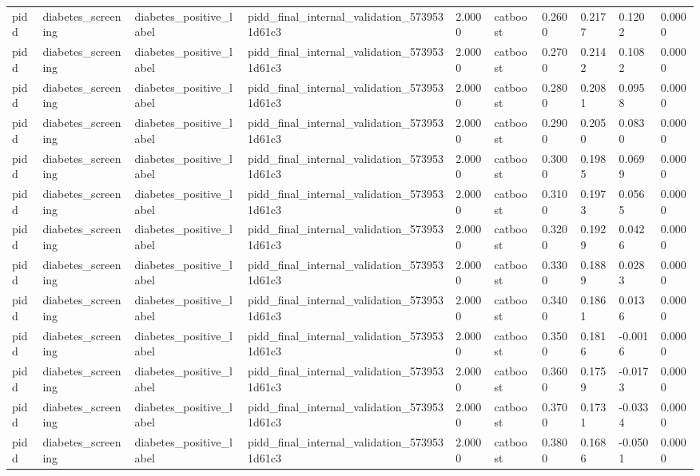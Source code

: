 \begin{tabular}{llllllllll}
pidd & diabetes\_screening & diabetes\_positive\_label & pidd\_final\_internal\_validation\_5739531d61c3 & 2.0000 & catboost & 0.2600 & 0.2177 & 0.1202 & 0.0000 \\
pidd & diabetes\_screening & diabetes\_positive\_label & pidd\_final\_internal\_validation\_5739531d61c3 & 2.0000 & catboost & 0.2700 & 0.2142 & 0.1082 & 0.0000 \\
pidd & diabetes\_screening & diabetes\_positive\_label & pidd\_final\_internal\_validation\_5739531d61c3 & 2.0000 & catboost & 0.2800 & 0.2081 & 0.0958 & 0.0000 \\
pidd & diabetes\_screening & diabetes\_positive\_label & pidd\_final\_internal\_validation\_5739531d61c3 & 2.0000 & catboost & 0.2900 & 0.2050 & 0.0830 & 0.0000 \\
pidd & diabetes\_screening & diabetes\_positive\_label & pidd\_final\_internal\_validation\_5739531d61c3 & 2.0000 & catboost & 0.3000 & 0.1985 & 0.0699 & 0.0000 \\
pidd & diabetes\_screening & diabetes\_positive\_label & pidd\_final\_internal\_validation\_5739531d61c3 & 2.0000 & catboost & 0.3100 & 0.1973 & 0.0565 & 0.0000 \\
pidd & diabetes\_screening & diabetes\_positive\_label & pidd\_final\_internal\_validation\_5739531d61c3 & 2.0000 & catboost & 0.3200 & 0.1929 & 0.0426 & 0.0000 \\
pidd & diabetes\_screening & diabetes\_positive\_label & pidd\_final\_internal\_validation\_5739531d61c3 & 2.0000 & catboost & 0.3300 & 0.1889 & 0.0283 & 0.0000 \\
pidd & diabetes\_screening & diabetes\_positive\_label & pidd\_final\_internal\_validation\_5739531d61c3 & 2.0000 & catboost & 0.3400 & 0.1861 & 0.0136 & 0.0000 \\
pidd & diabetes\_screening & diabetes\_positive\_label & pidd\_final\_internal\_validation\_5739531d61c3 & 2.0000 & catboost & 0.3500 & 0.1816 & -0.0016 & 0.0000 \\
pidd & diabetes\_screening & diabetes\_positive\_label & pidd\_final\_internal\_validation\_5739531d61c3 & 2.0000 & catboost & 0.3600 & 0.1759 & -0.0173 & 0.0000 \\
pidd & diabetes\_screening & diabetes\_positive\_label & pidd\_final\_internal\_validation\_5739531d61c3 & 2.0000 & catboost & 0.3700 & 0.1731 & -0.0334 & 0.0000 \\
pidd & diabetes\_screening & diabetes\_positive\_label & pidd\_final\_internal\_validation\_5739531d61c3 & 2.0000 & catboost & 0.3800 & 0.1686 & -0.0501 & 0.0000 \\

\end{tabular}
